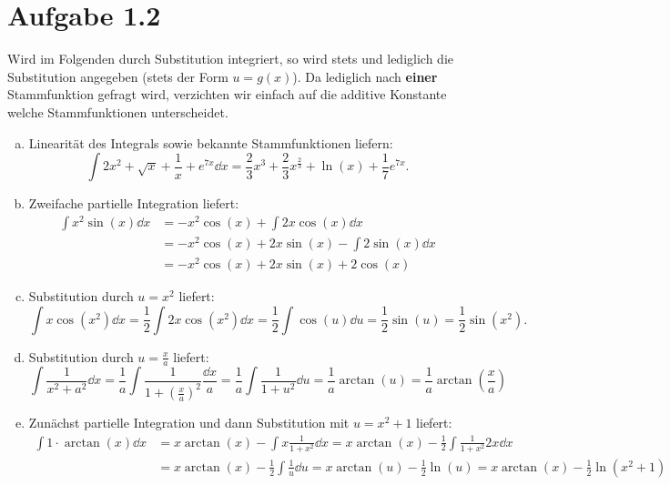 \documentclass{theozettel}
\begin{document}
\newpage
\section*{Aufgabe 1.2}
Wird im Folgenden durch Substitution integriert, so wird stets und lediglich die Substitution angegeben (stets der Form $u = g(x)$). Da lediglich nach \textbf{einer} Stammfunktion gefragt wird, verzichten wir einfach auf die additive Konstante welche Stammfunktionen unterscheidet.
\begin{enumerate}[(a)]
	\item 	Linearität des Integrals sowie bekannte Stammfunktionen liefern:
			\[
				\int 2x^{2} + \sqrt{x} + \frac{1}{x} + e^{7x}\dd x = \frac{2}{3}x^{3} + \frac{2}{3}x^{\frac{2}{3}} + \ln(x) + \frac{1}{7}e^{7x}.
			\]
	
	\item 	Zweifache partielle Integration liefert:
			\begin{align*}
				\int x^{2} \sin(x) \dd x &= -x^{2} \cos(x) + \int 2x \cos(x) \dd x \\
				&= -x^{2}\cos(x) + 2x\sin(x) - \int 2\sin(x) \dd x \\
				&= -x^{2}\cos(x) + 2x\sin(x) + 2\cos(x)
			\end{align*}
			
	\item 	Substitution durch $u = x^{2}$ liefert:
			\[
				\int x \cos(x^{2}) \dd x = \frac{1}{2} \int 2x \cos(x^{2}) \dd x = \frac{1}{2} \int \cos(u) \dd u = \frac{1}{2} \sin(u) = \frac{1}{2} \sin(x^{2}).
			\]
	
	\item 	Substitution durch $u = \frac{x}{a}$ liefert:
			\[
				\int \frac{1}{x^{2}+a^{2}} \dd x = \frac{1}{a} \int \frac{1}{1 + \left(\frac{x}{a}\right)^{2}} \frac{\dd x}{a} = \frac{1}{a} \int \frac{1}{1+u^{2}} \dd u = \frac{1}{a} \arctan(u) = \frac{1}{a}\arctan(\frac{x}{a})
			\]
	
	\item 	Zunächst partielle Integration und dann Substitution mit $u = x^{2} + 1$ liefert:
			\begin{align*}
				\int 1 \cdot \arctan(x) \dd x &= x\arctan(x) - \int x \frac{1}{1+x^{2}} \dd x =  x\arctan(x) - \frac{1}{2}\int \frac{1}{1+x^{2}} 2x \dd x \\
				&= x \arctan(x) - \frac{1}{2} \int \frac{1}{u} \dd u = x\arctan(u) - \frac{1}{2} \ln(u) = x\arctan(x) - \frac{1}{2}\ln(x^{2}+1)
			\end{align*}
\end{enumerate}
\end{document}
